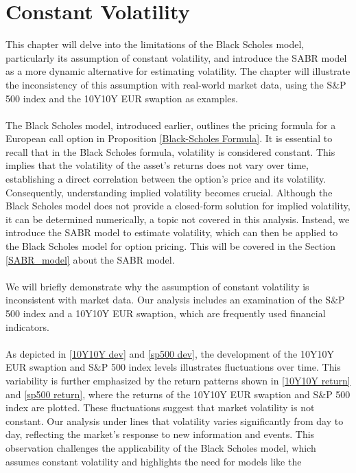\section{Constant Volatility}
This chapter will delve into the limitations 
of the Black Scholes model, particularly its 
assumption of constant volatility, and introduce 
the SABR model as a more dynamic alternative for estimating volatility. 
The chapter will illustrate the inconsistency of 
this assumption with real-world market data, 
using the S$\&$P 500 index and the 10Y10Y EUR swaption 
as examples.
\\\\
The Black Scholes model, introduced earlier, outlines the pricing formula for a European call option in 
Proposition \autoref{Black-Scholes Formula}. It is  essential to recall that in the Black Scholes formula, 
volatility is considered constant. This implies that the volatility of the asset's returns does not vary over time,
establishing a direct correlation between the option's price and its volatility. Consequently, 
understanding implied volatility becomes crucial. Although the Black Scholes model does not provide 
a closed-form solution for implied volatility, it can be determined numerically, a topic not covered 
in this analysis. Instead, we introduce the SABR model to estimate volatility, which can then be 
applied to the Black Scholes model for option pricing. This will be covered in the Section \ref{SABR_model} about the 
SABR model. 
\\\\
We will briefly demonstrate why the assumption of constant volatility is inconsistent with market data. 
Our analysis includes an examination of the S$\&$P 500 index and a 10Y10Y EUR swaption, which are frequently used 
financial indicators. 
\\\\
As depicted in \autoref{10Y10Y dev} and \autoref{sp500 dev}, the development of the 10Y10Y EUR swaption 
and S$\&$P 500 index levels illustrates fluctuations over time. This variability is further emphasized by the return patterns 
shown in \autoref{10Y10Y return} and \autoref{sp500 return}, where the returns of the 10Y10Y EUR swaption and S$\&$P 500 index are plotted. 
These fluctuations suggest that market volatility is not constant. Our analysis under lines that volatility varies 
significantly from day to day, reflecting the market's response to new information and events. This observation challenges 
the applicability of the Black Scholes model, which assumes constant volatility and highlights the need for models like the 
